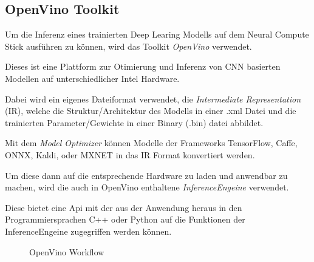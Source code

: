 \subsection{OpenVino Toolkit}



Um die Inferenz eines trainierten Deep Learing Modells auf dem
Neural Compute Stick ausführen zu können, wird das Toolkit 
\textit{OpenVino} verwendet.

Dieses ist eine Plattform zur Otimierung und Inferenz von 
CNN basierten Modellen auf unterschiedlicher Intel Hardware.





Dabei wird ein eigenes Dateiformat verwendet, die \textit{Intermediate 
Representation} (IR), welche die Struktur/Architektur des Modells 
in einer .xml Datei und die trainierten Parameter/Gewichte in 
einer Binary (.bin) datei abbildet.

Mit dem \textit{Model Optimizer} können Modelle der Frameworks 
TensorFlow, Caffe, ONNX, Kaldi, oder MXNET in das IR Format 
konvertiert werden.

Um diese dann auf die entsprechende Hardware zu laden und anwendbar 
zu machen, wird die auch in OpenVino enthaltene
\textit{InferenceEngeine} verwendet.

Diese bietet eine Api mit der aus der Anwendung heraus in den 
Programmiersprachen C++ oder Python auf die Funktionen der 
InferenceEngeine zugegriffen werden können.



\begin{figure}[H]
    \centering
    \def\svgwidth{0.8\textwidth}
    
    \caption{OpenVino Workflow}
    \label{fig:openvinoflow}
\end{figure}



